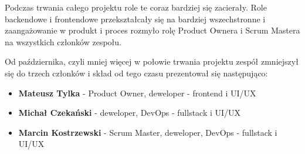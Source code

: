 \documentclass{article}
\begin{document}
Podczas trwania całego projektu role te coraz bardziej się zacierały. Role backendowe i frontendowe przekształcały się na bardziej wszechstronne i zaangażowanie w produkt i proces rozmyło rolę Product Ownera i Scrum Mastera na wszystkich członków zespołu.

Od października, czyli mniej więcej w połowie trwania projektu zespół zmniejszył się do trzech członków i skład od tego czasu prezentował się następująco:
\begin{itemize}
    \item \textbf{Mateusz Tylka} - Product Owner, deweloper - frontend i UI/UX
    \item \textbf{Michał Czekański} - deweloper, DevOps - fullstack i UI/UX
    \item \textbf{Marcin Kostrzewski} - Scrum Master, deweloper, DevOps - fullstack i UI/UX
\end{itemize}
\end{document}
